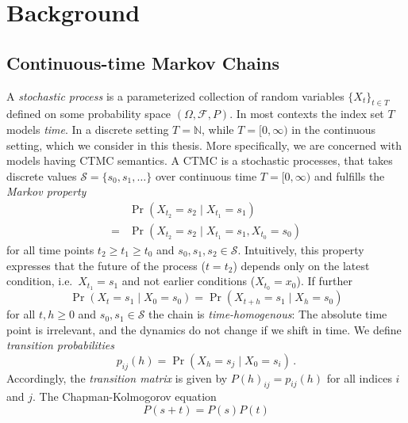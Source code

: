 \chapter{Background}\label{ch:background}

\section{Continuous-time Markov Chains}
A \emph{stochastic process} is a parameterized collection of random variables $\{X_t\}_{t\in T}$ defined on some probability space $(\Omega, \mathcal{F}, P)$.
In most contexts the index set $T$ models \emph{time}.
In a discrete setting $T=\mathbb{N}$, while $T=[0,\infty)$ in the continuous setting, which we consider in this thesis.
More specifically, we are concerned with models having \acf{CTMC} semantics.
A \ac{CTMC} is a stochastic processes, that takes discrete values $\mathcal{S}=\{s_0, s_1,\dots\}$ over continuous time $T=[0,\infty)$ and fulfills the \emph{Markov property}
\begin{equation}\label{eq:markov_prop}
	\begin{split}
		&\Pr\left({X_{t_2} = s_2 \mid X_{t_1} = s_1}\right) \\ = &\Pr\left({X_{t_2}=s_2 \mid X_{t_1} = s_1, X_{t_0} = s_0}\right)
	\end{split}
\end{equation}
for all time points $t_2 \geq t_1 \geq t_0$ and $s_0, s_1, s_2\in\mathcal{S}$.
Intuitively, this property expresses that the future of the process ($t=t_2$) depends only on the latest condition, i.e.\ $X_{t_1}=s_1$ and not earlier conditions ($X_{t_0}=x_0$).
If further
\begin{equation}\label{time_homo}
	\Pr\left(X_t=s_1\mid X_0 = s_0\right)
	=\Pr\left(X_{t+h}=s_1\mid X_h=s_0\right)
\end{equation}
for all $t,h\geq 0$ and $s_0, s_1\in\mathcal{S}$ the chain is \emph{time-homogenous}:
The absolute time point is irrelevant, and the dynamics do not change if we shift in time.
We define \emph{transition probabilities}
\begin{equation}
	p_{ij}(h) = \Pr(X_h = s_j\mid X_0=s_i)\,.
\end{equation}
Accordingly, the \emph{transition matrix} is given by $P(h)_{ij} = p_{ij}(h)$ for all indices $i$ and $j$.
The Chapman-Kolmogorov equation
\begin{equation}
	P(s+t) = P(s)P(t)
\end{equation}

